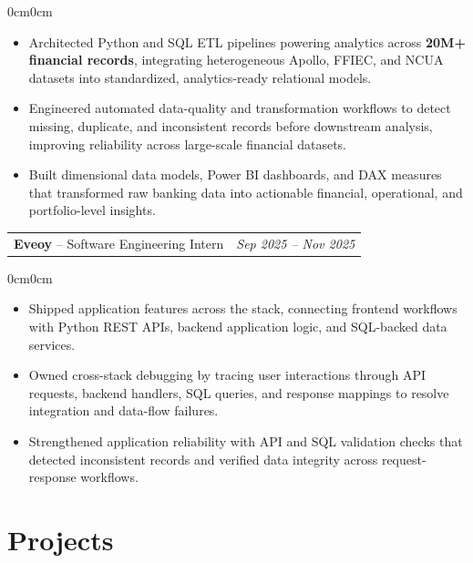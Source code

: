 \documentclass[10pt, letterpaper]{article}
\newenvironment{highlights}{
    \begin{itemize}[
        topsep=0.04cm,
        parsep=0.02cm,
        partopsep=0pt,
        itemsep=0.03cm,
        leftmargin=12pt
    ]
}{
    \end{itemize}
}
\newenvironment{onecolentry}{
    \begin{adjustwidth}{0cm}{0cm}
}{
    \end{adjustwidth}
}
\begin{document}
\begin{onecolentry}
\begin{highlights}
    \item Architected Python and SQL ETL pipelines powering analytics across
    \textbf{20M+ financial records}, integrating heterogeneous Apollo, FFIEC,
    and NCUA datasets into standardized, analytics-ready relational models.
    \item Engineered automated data-quality and transformation workflows to
    detect missing, duplicate, and inconsistent records before downstream
    analysis, improving reliability across large-scale financial datasets.
    \item Built dimensional data models, Power BI dashboards, and DAX measures
    that transformed raw banking data into actionable financial, operational,
    and portfolio-level insights.
\end{highlights}
\end{onecolentry}

\vspace{0.10cm}

\begin{tabularx}{\textwidth}{Xr}
    \textbf{Eveoy} -- Software Engineering Intern
        & \textit{Sep 2025 -- Nov 2025}
\end{tabularx}

\begin{onecolentry}
\begin{highlights}
    \item Shipped application features across the stack, connecting frontend
    workflows with Python REST APIs, backend application logic, and SQL-backed
    data services.
    \item Owned cross-stack debugging by tracing user interactions through API
    requests, backend handlers, SQL queries, and response mappings to resolve
    integration and data-flow failures.
    \item Strengthened application reliability with API and SQL validation checks
    that detected inconsistent records and verified data integrity across
    request-response workflows.
\end{highlights}
\end{onecolentry}


\section{Projects}
\end{document}

